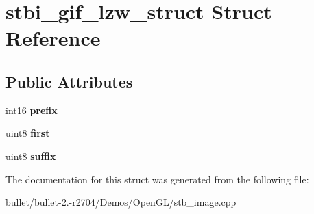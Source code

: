 \hypertarget{structstbi__gif__lzw__struct}{\section{stbi\+\_\+gif\+\_\+lzw\+\_\+struct Struct Reference}
\label{structstbi__gif__lzw__struct}
}
\subsection*{Public Attributes}
\begin{DoxyCompactItemize}
\item 
\hypertarget{structstbi__gif__lzw__struct_a0e5142cb4117b905eb9efd73c436525c}{int16 {\bfseries prefix}}\label{structstbi__gif__lzw__struct_a0e5142cb4117b905eb9efd73c436525c}

\item 
\hypertarget{structstbi__gif__lzw__struct_a08129c445d56c0983285d6e0e71b83bd}{uint8 {\bfseries first}}\label{structstbi__gif__lzw__struct_a08129c445d56c0983285d6e0e71b83bd}

\item 
\hypertarget{structstbi__gif__lzw__struct_a3ec7f462268018489345b79b2f123764}{uint8 {\bfseries suffix}}\label{structstbi__gif__lzw__struct_a3ec7f462268018489345b79b2f123764}

\end{DoxyCompactItemize}


The documentation for this struct was generated from the following file\+:\begin{DoxyCompactItemize}
\item 
bullet/bullet-\/2.-\/r2704/\+Demos/\+Open\+G\+L/stb\+\_\+image.\+cpp\end{DoxyCompactItemize}
